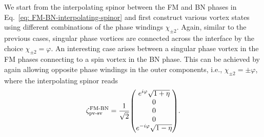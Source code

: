 We start from the interpolating spinor between the FM and BN phases in
Eq.~\eqref{eq: FM-BN-interpolating-spinor} and first construct various vortex
states using different combinations of the phase windings \(\chi_{\pm 2}\).
Again, similar to the previous cases, singular phase vortices are connected
across the interface by the choice \(\chi_{\pm 2} = \varphi \).
An interesting case arises between a singular phase vortex in the FM phases
connecting to a spin vortex in the BN phase.
This can be achieved by again allowing opposite phase windings in the outer
components, i.e., \(\chi_{\pm 2} = \pm \varphi \), where the interpolating
spinor reads
\begin{align}\label{eq: FM-BN-pv-sv}
    \zeta^\text{FM-BN}_\text{pv-sv} = \frac{1}{\sqrt{2}}\mqty(
    e^{i\varphi} \sqrt{1 + \eta} \\
    0 \\
    0 \\
    0 \\
    e^{-i\varphi} \sqrt{1 - \eta}).
\end{align}

